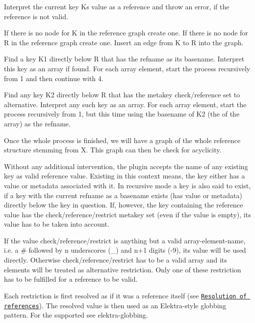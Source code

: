 \begin{DoxyEnumerate}
\item Interpret the current key {\ttfamily K}s value as a reference and throw an error, if the reference is not valid.
\item If there is no node for {\ttfamily K} in the reference graph create one. If there is no node for {\ttfamily R} in the reference graph create one. Insert an edge from {\ttfamily K} to {\ttfamily R} into the graph.
\item Find a key {\ttfamily K1} directly below {\ttfamily R} that has the {\ttfamily refname} as its basename. Interpret this key as an array if found. For each array element, start the process recursively from 1 and then continue with 4.
\item Find any key {\ttfamily K2} directly below {\ttfamily R} that has the metakey {\ttfamily check/reference} set to {\ttfamily alternative}. Interpret any such key as an array. For each array element, start the process recursively from 1, but this time using the basename of {\ttfamily K2} (the of the array) as the {\ttfamily refname}.
\end{DoxyEnumerate}

Once the whole process is finished, we will have a graph of the whole reference structure stemming from {\ttfamily X}. This graph can then be check for acyclicity.

Without any additional intervention, the plugin accepts the name of any existing key as valid reference value. Existing in this context means, the key either has a value or metadata associated with it. In recursive mode a key is also said to exist, if a key with the current {\ttfamily refname} as a basename exists (has value or metadata) directly below the key in question. If, however, the key containing the reference value has the {\ttfamily check/reference/restrict} metakey set (even if the value is empty), its value has to be taken into account.

If the value {\ttfamily check/reference/restrict} is anything but a valid array-\/element-\/name, i.\+e. a {\ttfamily \#} followed by {\ttfamily n} underscores ({\ttfamily \+\_\+}) and {\ttfamily n+1} digits ({-\/9}), its value will be used directly. Otherwise {\ttfamily check/reference/restrict} has to be a valid array and its elements will be treated as alternative restriction. Only one of these restriction has to be fulfilled for a reference to be valid.

Each restriction is first resolved as if it was a reference itself (see \href{#resolution-of-references}{\tt Resolution of references}). The resolved value is then used as an Elektra-\/style globbing pattern. For the supported see elektra-\/globbing.

